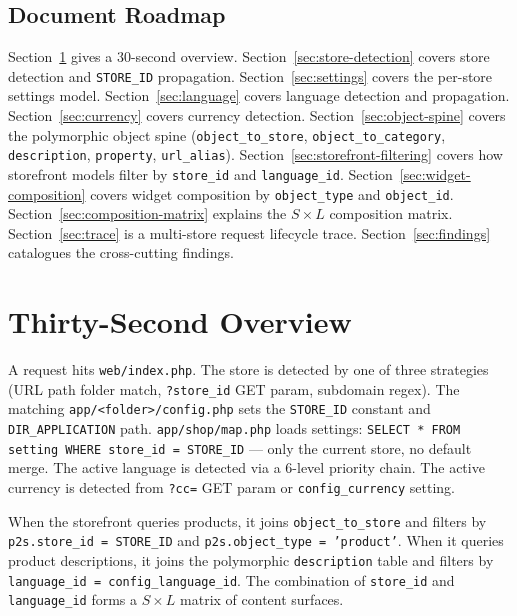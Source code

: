 \documentclass[11pt,a4paper]{article}
\begin{document}
\subsection{Document Roadmap}

Section~\ref{sec:overview} gives a 30-second overview.
Section~\ref{sec:store-detection} covers store detection and
\texttt{STORE\_ID} propagation.
Section~\ref{sec:settings} covers the per-store settings model.
Section~\ref{sec:language} covers language detection and propagation.
Section~\ref{sec:currency} covers currency detection.
Section~\ref{sec:object-spine} covers the polymorphic object spine
(\texttt{object\_to\_store}, \texttt{object\_to\_category},
\texttt{description}, \texttt{property}, \texttt{url\_alias}).
Section~\ref{sec:storefront-filtering} covers how storefront models
filter by \texttt{store\_id} and \texttt{language\_id}.
Section~\ref{sec:widget-composition} covers widget composition by
\texttt{object\_type} and \texttt{object\_id}.
Section~\ref{sec:composition-matrix} explains the $S \times L$
composition matrix.
Section~\ref{sec:trace} is a multi-store request lifecycle trace.
Section~\ref{sec:findings} catalogues the cross-cutting findings.

\section{Thirty-Second Overview}\label{sec:overview}

A request hits \texttt{web/index.php}. The store is detected by one of
three strategies (URL path folder match, \texttt{?store\_id} GET param,
subdomain regex). The matching \texttt{app/<folder>/config.php} sets the
\texttt{STORE\_ID} constant and \texttt{DIR\_APPLICATION} path.
\texttt{app/shop/map.php} loads settings:
\texttt{SELECT * FROM setting WHERE store\_id = STORE\_ID} --- only the
current store, no default merge. The active language is detected via a
6-level priority chain. The active currency is detected from
\texttt{?cc=} GET param or \texttt{config\_currency} setting.

When the storefront queries products, it joins
\texttt{object\_to\_store} and filters by
\texttt{p2s.store\_id = STORE\_ID} and
\texttt{p2s.object\_type = 'product'}. When it queries product
descriptions, it joins the polymorphic \texttt{description} table and
filters by \texttt{language\_id = config\_language\_id}. The combination
of \texttt{store\_id} and \texttt{language\_id} forms a $S \times L$
matrix of content surfaces.
\end{document}
